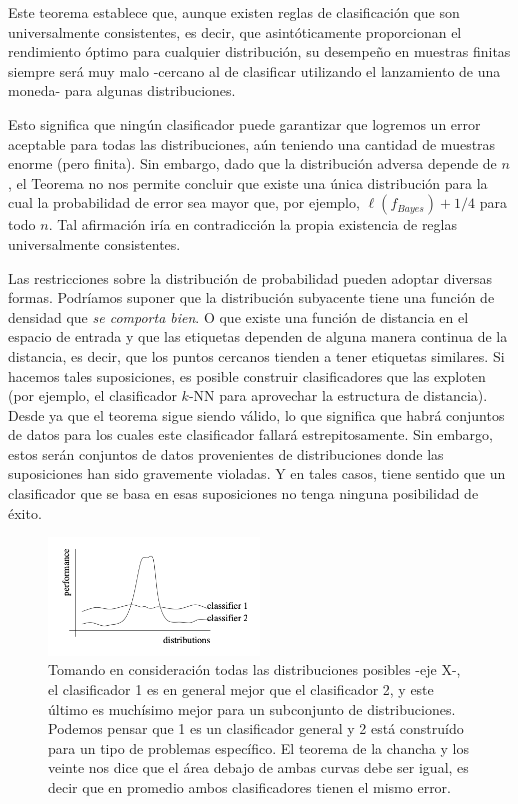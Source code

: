 \documentclass{report}
\begin{document}
Este teorema establece que, aunque existen reglas de clasificación que son universalmente 
consistentes, es decir, que asintóticamente proporcionan el rendimiento óptimo para cualquier 
distribución, su desempeño en muestras finitas siempre será muy malo -cercano al de clasificar utilizando el lanzamiento de una moneda- para algunas 
distribuciones. \newline

Esto significa que ningún clasificador puede garantizar que logremos un error aceptable 
para todas las distribuciones, aún teniendo una cantidad de muestras enorme (pero finita). 
Sin embargo, dado que la distribución adversa depende de \(n\), 
el Teorema no nos permite concluir que existe una única distribución para la cual la 
probabilidad de error sea mayor que, por ejemplo, \(\ell(f_{Bayes}) + 1/4\) para todo \(n\). Tal afirmación 
iría en contradicción la propia existencia de reglas universalmente consistentes. \newline


Las restricciones sobre la distribución de probabilidad pueden adoptar diversas formas. Podríamos suponer que la distribución 
subyacente tiene una función de densidad que \textit{se comporta bien}. O
que existe una función de distancia en el espacio de entrada y que las etiquetas dependen de alguna manera 
continua de la distancia, es decir, que los puntos cercanos tienden a tener etiquetas similares. Si 
hacemos tales suposiciones, es posible construir clasificadores que las exploten (por ejemplo, el clasificador 
\(k\)-NN para aprovechar la estructura de distancia). Desde ya que el teorema sigue siendo válido, lo que significa que habrá conjuntos de datos 
para los cuales este clasificador fallará estrepitosamente. Sin embargo, estos serán conjuntos de datos 
provenientes de distribuciones donde las suposiciones han sido gravemente violadas. Y en tales casos, tiene 
sentido que un clasificador que se basa en esas suposiciones no tenga ninguna posibilidad de éxito.

\begin{figure}[ht!]
    \centering
    \includegraphics[width=0.5\textwidth]{Images/7.png}
    \caption{Tomando en consideración todas las distribuciones posibles -eje X-, el clasificador 1
    es en general mejor que el clasificador 2, y este último es muchísimo mejor para un subconjunto
    de distribuciones. Podemos pensar que 1 es un clasificador general y 2 está construído para un tipo
    de problemas específico. El teorema de la chancha y los veinte nos dice que el área debajo de ambas
    curvas debe ser igual, es decir que en promedio ambos clasificadores tienen el mismo error.}
    \label{fig:no_free_lunch_theorem}
\end{figure}
\end{document}

